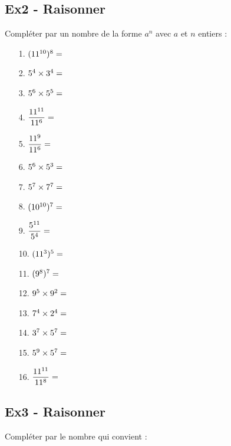 \documentclass[12pt]{article}
\begin{document}
\subsection*{Ex2 - Raisonner}

Compléter par un nombre de la forme $a^n$ avec $a$ et $n$ entiers :

\begin{multicols}{4}
  \begin{enumerate}
  \item[1.] $(11^{10})^{8}=\dotfill$
  \item[2.] $5^{4} \times 3^{4} = \dotfill$
  \item[3.] $5^{6}\times5^{5}=\dotfill$
  \item[4.] $\dfrac{11^{11}}{11^{6}}=\dotfill$
  \item[5.] $\dfrac{11^{9}}{11^{6}}=\dotfill$
  \item[6.] $5^{6}\times5^{3}=\dotfill$
  \item[7.] $5^{7} \times 7^{7} = \dotfill$
  \item[8.] $(10^{10})^{7}=\dotfill$
  \item[9.] $\dfrac{5^{11}}{5^{4}}=\dotfill$
  \item[10.] $(11^{3})^{5}=\dotfill$
  \item[11.] $(9^{8})^{7}=\dotfill$
  \item[12.] $9^{5}\times9^{2}=\dotfill$
  \item[13.] $7^{4} \times 2^{4} = \dotfill$
  \item[14.] $3^{7} \times 5^{7} = \dotfill$
  \item[15.] $5^{9}\times5^{7}=\dotfill$
  \item[16.] $\dfrac{11^{11}}{11^{8}}=\dotfill$
  \end{enumerate}
\end{multicols}


\subsection*{Ex3 - Raisonner}
Compléter par le nombre qui convient :
\end{document}
